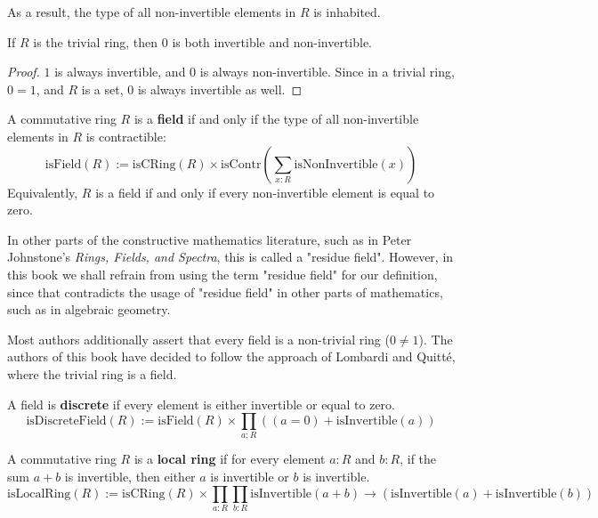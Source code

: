 As a result, the type of all non-invertible elements in $R$ is inhabited. 

\begin{theorem}
If $R$ is the trivial ring, then $0$ is both invertible and non-invertible.
\end{theorem}

\begin{proof}
$1$ is always invertible, and $0$ is always non-invertible. Since in a trivial ring, $0 = 1$, and $R$ is a set, $0$ is always invertible as well. 
\end{proof}

\begin{definition}
A commutative ring $R$ is a \textbf{field} if and only if the type of all non-invertible elements in $R$ is contractible:
$$\mathrm{isField}(R) := \mathrm{isCRing}(R) \times \mathrm{isContr}\left(\sum_{x:R} \mathrm{isNonInvertible}(x)\right)$$ 
Equivalently, $R$ is a field if and only if every non-invertible element is equal to zero. 
\end{definition}

\begin{remark}
In other parts of the constructive mathematics literature, such as in Peter Johnstone's \textit{Rings, Fields, and Spectra}, this is called a "residue field". However, in this book we shall refrain from using the term "residue field" for our definition, since that contradicts the usage of "residue field" in other parts of mathematics, such as in algebraic geometry. 
\end{remark}

\begin{remark}
Most authors additionally assert that every field is a non-trivial ring ($0 \neq 1$). The authors of this book have decided to follow the approach of Lombardi and Quitté, where the trivial ring is a field. 
\end{remark}

\begin{definition}
A field is \textbf{discrete} if every element is either invertible or equal to zero. 
$$\mathrm{isDiscreteField}(R) := \mathrm{isField}(R) \times \prod_{a:R} \left((a = 0) + \mathrm{isInvertible}(a)\right)$$ 
\end{definition}

\begin{definition}
A commutative ring $R$ is a \textbf{local ring} if for every element $a:R$ and $b:R$, if the sum $a + b$ is invertible, then either $a$ is invertible or $b$ is invertible. 
$$\mathrm{isLocalRing}(R) := \mathrm{isCRing}(R) \times \prod_{a:R} \prod_{b:R} \mathrm{isInvertible}(a + b) \to \left(\mathrm{isInvertible}(a) + \mathrm{isInvertible}(b)\right)$$ 
\end{definition}

